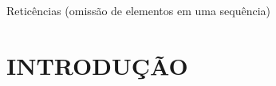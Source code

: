 \documentclass[
        oneside,      %
        english,			
        brazil			 
        ]{configcefetmglpd}
\begin{document}

\cleardoublepage


 \listoftables*   

\cleardoublepage



 


\begin{simbolos} %
  \item[$ \ldots $] Reticências (omissão de elementos em uma sequência)


  

  
 \end{simbolos}

 
\tableofcontents*
\cleardoublepage


\textual %


\chapter{INTRODUÇÃO}

\end{document}
